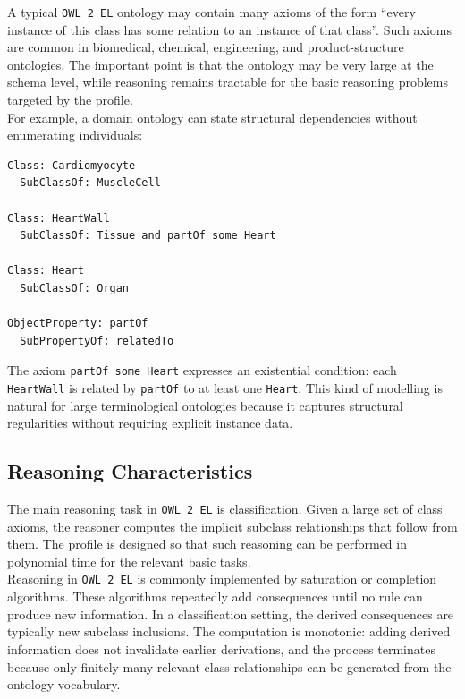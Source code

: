 \documentclass{scrbook}
\begin{document}
	A typical \texttt{OWL 2 EL} ontology may contain many axioms of the form ``every instance of this class has some relation to an instance of that class''. Such axioms are common in biomedical, chemical, engineering, and product-structure ontologies. The important point is that the ontology may be very large at the schema level, while reasoning remains tractable for the basic reasoning problems targeted by the profile.\\
	
	For example, a domain ontology can state structural dependencies without enumerating individuals:
	\begin{lstlisting}
Class: Cardiomyocyte
  SubClassOf: MuscleCell

Class: HeartWall
  SubClassOf: Tissue and partOf some Heart

Class: Heart
  SubClassOf: Organ

ObjectProperty: partOf
  SubPropertyOf: relatedTo
	\end{lstlisting}
	
	The axiom \texttt{partOf some Heart} expresses an existential condition: each \texttt{HeartWall} is related by \texttt{partOf} to at least one \texttt{Heart}. This kind of modelling is natural for large terminological ontologies because it captures structural regularities without requiring explicit instance data.
	
	\subsection{Reasoning Characteristics}
	
	The main reasoning task in \texttt{OWL 2 EL} is classification. Given a large set of class axioms, the reasoner computes the implicit subclass relationships that follow from them. The profile is designed so that such reasoning can be performed in polynomial time for the relevant basic tasks.\\
	
	Reasoning in \texttt{OWL 2 EL} is commonly implemented by saturation or completion algorithms. These algorithms repeatedly add consequences until no rule can produce new information. In a classification setting, the derived consequences are typically new subclass inclusions. The computation is monotonic: adding derived information does not invalidate earlier derivations, and the process terminates because only finitely many relevant class relationships can be generated from the ontology vocabulary.\\
	
\end{document}
